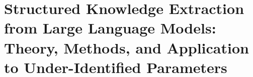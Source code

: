 \section{Structured Knowledge Extraction from Large Language Models: Theory, Methods, and Application to Under-Identified Parameters}
\label{app:llm-monte-carlo}


\begin{abstract}
This appendix develops a systematic methodology for extracting quantitative parameter estimates from Large Language Models (LLMs). Building on recent work showing that LLMs can provide informative Bayesian priors \citep{zhu2024eliciting, llmpriors2025scientific, nafar2025extracting}, we extend the approach to under-identified parameters in structural economic models. We contribute: (1) a theoretical framework interpreting LLMs as compressed representations of scientific consensus, (2) three distinct extraction methods with validation protocols, (3) a Bayesian integration procedure for combining LLM priors with empirical data, and (4) a practical demonstration estimating 48 context-welfare interaction coefficients. The methodology addresses a fundamental problem in structural modeling: the gap between theoretical frameworks predicting heterogeneous effects and empirical capacity to estimate context-dependent parameters.
\end{abstract}


